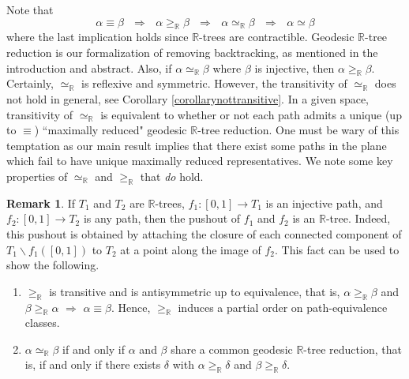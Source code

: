 \documentclass[12pt, leqno]{amsart}
\newcommand{\ui}{[0,1]}
\newcommand{\den}{\simeq_{\bbr}}
\newcommand{\bbr}{\mathbb{R}}
\theoremstyle{definition}\newtheorem{definition}[theorem]{Definition}
\newtheorem{remark}[theorem]{Remark}
\begin{document}
Note that \[\alpha\equiv\beta\text{ }\Rightarrow\text{ }\alpha\geq_{\bbr}\beta\text{ }\Rightarrow\text{ }\alpha\den\beta\text{ }\Rightarrow\text{ }\alpha\simeq \beta\] where the last implication holds since $\bbr$-trees are contractible. Geodesic $\bbr$-tree reduction is our formalization of removing backtracking, as mentioned in the introduction and abstract. Also, if $\alpha\den\beta$ where $\beta$ is injective, then $\alpha\geq_{\bbr}\beta$. Certainly, $\den$ is reflexive and symmetric. However, the transitivity of $\den$ does not hold in general, see Corollary \ref{corollarynottransitive}. In a given space, transitivity of $\den$ is equivalent to whether or not each path admits a unique (up to $\equiv$) ``maximally reduced" geodesic $\bbr$-tree reduction. One must be wary of this temptation as our main result implies that there exist some paths in the plane which fail to have unique maximally reduced representatives. We note some key properties of $\den$ and $\geq_{\bbr}$ that \textit{do} hold.

\begin{remark}
If $T_1$ and $T_2$ are $\bbr$-trees, $f_1:\ui\to T_1$ is an injective path, and $f_2:\ui\to T_2$ is any path, then the pushout of $f_1$ and $f_2$ is an $\bbr$-tree. Indeed, this pushout is obtained by attaching the closure of each connected component of $T_1\backslash f_1(\ui)$ to $T_2$ at a point along the image of $f_2$. This fact can be used to show the following.
\begin{enumerate}
\item $\geq_{\bbr}$ is transitive and is antisymmetric up to equivalence, that is, $\alpha\geq_{\bbr}\beta$ and $\beta \geq_{\bbr}\alpha$ $\Rightarrow$ $\alpha\equiv \beta$. Hence, $\geq_{\bbr}$ induces a partial order on path-equivalence classes.
\item $\alpha\den\beta$ if and only if $\alpha$ and $\beta$ share a common geodesic $\bbr$-tree reduction, that is, if and only if there exists $\delta$ with $\alpha\geq_{\bbr}\delta$ and $\beta\geq_{\bbr}\delta$.
\end{enumerate}
\end{remark}
\end{document}
